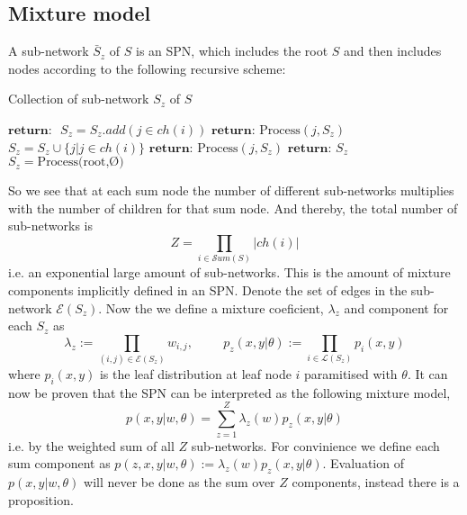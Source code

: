 \subsection*{Mixture model}
\begin{definition} 
    A sub-network $\bar S_z$ of $S$ is an SPN, which includes the root $S$ and then includes nodes
    according to the following recursive scheme: 
\end{definition}
\begin{algorithm}[H]
    \caption*{Collection of sub-network $S_z$ of $S$}\label{SPN3}
    \begin{algorithmic}
        \State  $\textbf{return: }$ 
    \EndIf
        \State $S_z =S_z.add(j \in ch(i))$ 
        \State $\textbf{return: } \text{Process}(j, S_z)$
    \EndIf
        \State $S_z =S_z \cup \{j | j \in ch(i)\}$ 
            \State $\textbf{return: } \text{Process}(j,S_z)$
        \EndFor
    \EndIf
    \State $\textbf{return: } S_z$
    \EndFunction
    \State $S_z =  \text{Process(root,Ø)}$
    \end{algorithmic}
\end{algorithm}
So we see that at each sum node the number of different sub-networks multiplies with the number of children for that
sum node. And thereby, the total number of sub-networks is
 $$Z = \prod_{i\in \mathcal{S}um(S)}|ch(i)|$$ 
 i.e. an exponential large amount of sub-networks. This is the amount of
 mixture components implicitly defined in an SPN. 
 Denote the set of edges in the sub-network $\mathcal{E}(S_z)$.
Now the we define a mixture coeficient, $\lambda_z$ and component for each $S_z$ as 
$$\lambda_z := \prod_{(i,j)\in \mathcal{E}(S_z)} w_{i,j}, \hspace{1cm}
p_z(x,y|\theta) := \prod_{i \in \mathcal{L}(S_z)} p_i(x,y)$$
where $p_i(x,y)$ is the leaf distribution at leaf node $i$ paramitised with $\theta$. 
It can now be proven that the SPN can be interpreted as the following mixture model, 
$$p(x,y|w,\theta) = \sum_{z=1}^Z \lambda_z(w)p_z(x,y|\theta)$$
i.e. by the weighted sum of all $Z$ sub-networks. For convinience
we define each sum component as $p(z,x,y|w,\theta) := \lambda_z(w)p_z(x,y|\theta)$.
Evaluation of $p(x,y|w,\theta)$ will never be done as the sum over $Z$ components, 
instead there is a proposition. 

